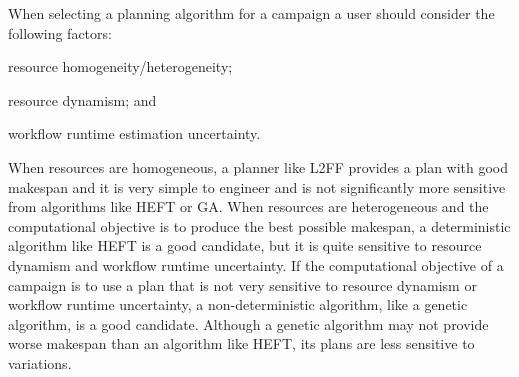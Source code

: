 When selecting a planning algorithm for a campaign a user should consider the following factors:
\begin{inparaenum}
    \item resource homogeneity/heterogeneity;
    \item resource dynamism; and
    \item workflow runtime estimation uncertainty.
\end{inparaenum}
When resources are homogeneous, a planner like L2FF provides a plan with good makespan and it is very simple to engineer and is not significantly more sensitive from algorithms like HEFT or GA.
When resources are heterogeneous and the computational objective is to produce the best possible makespan, a deterministic algorithm like HEFT is a good candidate, but it is quite sensitive to resource dynamism and workflow runtime uncertainty.
If the computational objective of a campaign is to use a plan that is not very sensitive to resource dynamism or workflow runtime uncertainty, a non-deterministic algorithm, like a genetic algorithm, is a good candidate.
Although a genetic algorithm may not provide worse makespan than an algorithm like HEFT, its plans are less sensitive to variations.



